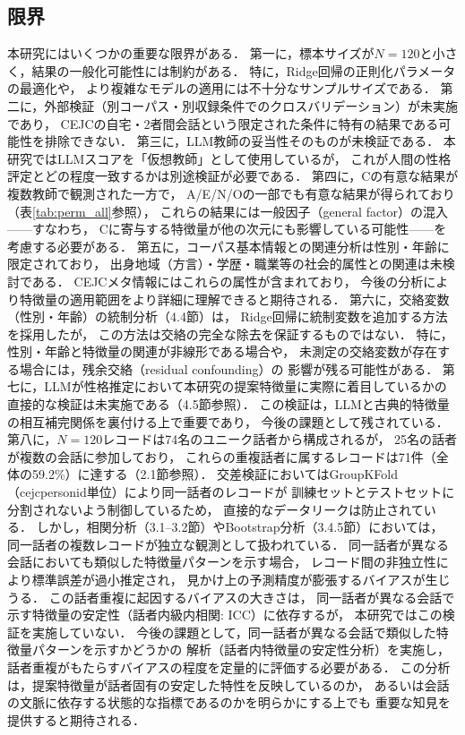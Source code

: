 \documentclass[dvipdfmx,11pt,a4paper]{bxjsarticle}
\renewcommand{\_}{\paperorigunderscore\allowbreak}%
\begin{document}
\subsection{限界}

本研究にはいくつかの重要な限界がある．
第一に，標本サイズが$N = 120$と小さく，結果の一般化可能性には制約がある．
特に，Ridge回帰の正則化パラメータの最適化や，
より複雑なモデルの適用には不十分なサンプルサイズである．
第二に，外部検証（別コーパス・別収録条件でのクロスバリデーション）が未実施であり，
CEJCの自宅・2者間会話という限定された条件に特有の結果である可能性を排除できない．
第三に，LLM教師の妥当性そのものが未検証である．
本研究ではLLMスコアを「仮想教師」として使用しているが，
これが人間の性格評定とどの程度一致するかは別途検証が必要である．
第四に，Cの有意な結果が複数教師で観測された一方で，
A/E/N/Oの一部でも有意な結果が得られており（表\ref{tab:perm_all}参照），
これらの結果には一般因子（general factor）の混入——すなわち，
Cに寄与する特徴量が他の次元にも影響している可能性——を考慮する必要がある．
第五に，コーパス基本情報との関連分析は性別・年齢に限定されており，
出身地域（方言）・学歴・職業等の社会的属性との関連は未検討である．
CEJCメタ情報にはこれらの属性が含まれており，
今後の分析により特徴量の適用範囲をより詳細に理解できると期待される．
第六に，交絡変数（性別・年齢）の統制分析（4.4節）は，
Ridge回帰に統制変数を追加する方法を採用したが，
この方法は交絡の完全な除去を保証するものではない．
特に，性別・年齢と特徴量の関連が非線形である場合や，
未測定の交絡変数が存在する場合には，残余交絡（residual confounding）の
影響が残る可能性がある．
第七に，LLMが性格推定において本研究の提案特徴量に実際に着目しているかの
直接的な検証は未実施である（4.5節参照）．
この検証は，LLMと古典的特徴量の相互補完関係を裏付ける上で重要であり，
今後の課題として残されている．
第八に，$N = 120$レコードは74名のユニーク話者から構成されるが，
25名の話者が複数の会話に参加しており，
これらの重複話者に属するレコードは71件（全体の59.2\%）に達する（2.1節参照）．
交差検証においてはGroupKFold（cejc\_person\_id単位）により同一話者のレコードが
訓練セットとテストセットに分割されないよう制御しているため，
直接的なデータリークは防止されている．
しかし，相関分析（3.1--3.2節）やBootstrap分析（3.4.5節）においては，
同一話者の複数レコードが独立な観測として扱われている．
同一話者が異なる会話においても類似した特徴量パターンを示す場合，
レコード間の非独立性により標準誤差が過小推定され，
見かけ上の予測精度が膨張するバイアスが生じうる．
この話者重複に起因するバイアスの大きさは，
同一話者が異なる会話で示す特徴量の安定性（話者内級内相関: ICC）に依存するが，
本研究ではこの検証を実施していない．
今後の課題として，同一話者が異なる会話で類似した特徴量パターンを示すかどうかの
解析（話者内特徴量の安定性分析）を実施し，
話者重複がもたらすバイアスの程度を定量的に評価する必要がある．
この分析は，提案特徴量が話者固有の安定した特性を反映しているのか，
あるいは会話の文脈に依存する状態的な指標であるのかを明らかにする上でも
重要な知見を提供すると期待される．
\end{document}

